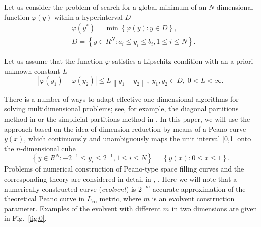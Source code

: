 \documentclass[smallcondensed]{svjour3}     %
\begin{document}
Let us consider the problem of search for a global minimum of an $N$-dimensional function $\varphi(y)$ within a hyperinterval $D$
\begin{eqnarray}\label{eq:1}
& \varphi(y^\ast)=\min{\left\{\varphi(y):y\in D\right\}},\\
& D=\left\{y\in R^N: a_i\leq y_i \leq b_i, 1\leq i \leq N\right\}. \nonumber
\end{eqnarray}

Let us assume that the function $\varphi$ satisfies a Lipschitz condition with an a priori unknown constant $L$
\[
\left|\varphi(y_1)-\varphi(y_2)\right|\leq L\left\|y_1-y_2\right\|,\; y_1,y_2 \in D,\; 0<L<\infty.
\]

There is a number of ways to adapt effective one-dimensional algorithms for solving multidimensional problems; see, for example, the diagonal partitions method in \cite{RefSergeyev2006} or the simplicial partitions method in \cite{RefZilinskas}. In this paper, we will use the approach based on the idea of dimension reduction by means of a Peano curve $y(x)$, which continuously and unambiguously maps the unit interval [0,1] onto the $n$-dimensional cube
\[
\left\{y\in R^N: -2^{-1}\leq y_i \leq 2^{-1}, 1 \leq i \leq N\right\}=\left\{y(x):0\leq x \leq 1 \right\}.
\]
Problems of numerical construction of Peano-type space filling curves and the corresponding theory are considered in detail in \cite{RefStrongin2000}, \cite{RefSergeyev2013}.  
Here we will note that a numerically constructed curve (\textit{evolvent}) is $2^{-m}$ accurate approximation of the theoretical Peano curve in $L_\infty$ metric, where $m$ is an evolvent construction parameter. Examples of the evolvent with different $m$ in two dimensions are given in Fig.~\ref{fig:0}.

\end{document}
